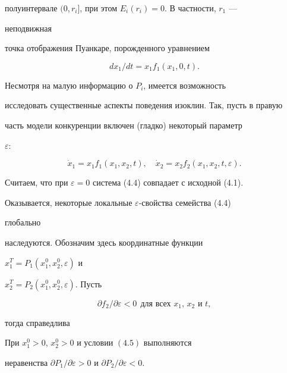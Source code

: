 полуинтервале $(0,r_i]$, при этом $E_i(r_i)=0$. В частности, $r_1$ --- 


неподвижная 


точка отображения Пуанкаре, порожденного уравнением 


\begin{equation} 


d x_1/d t=x_1f_1(x_1,0,t). 


\end{equation} 


Несмотря на малую информацию о $P_i$, имеется возможность 


исследовать существенные аспекты поведения изоклин. Так, пусть в правую 


часть модели конкуренции включен (гладко) некоторый параметр 


$\varepsilon$: 


\begin{equation} 


\Dot x_1=x_1f_1(x_1,x_2,t),\quad 


\Dot x_2=x_2f_2(x_1,x_2,t,\varepsilon). 


\end{equation} 


Считаем, что при $\varepsilon=0$ система (4.4) совпадает с исходной (4.1). 


Оказывается, некоторые локальные $\varepsilon$-свойства семейства (4.4) 


глобально 


наследуются. Обозначим здесь координатные функции 


$x^T_1=P_1(x^0_1,x^0_2,\varepsilon)$ и 


$x^T_2=P_2(x^0_1,x^0_2,\varepsilon)$. Пусть 


\begin{equation} 


\partial f_2/\partial\varepsilon<0 


\ \ \text{для всех $x_1$, $x_2$ и $t$},


\end{equation} 


тогда справедлива 


 


\begin{lem} 


При $x^0_1>0$, $x^0_2>0$ и условии $(4.5)$ выполняются 


неравенства $\partial P_1/\partial\varepsilon>0$ и $\partial 


P_2/\partial\varepsilon<0$. 


\end{lem} 


